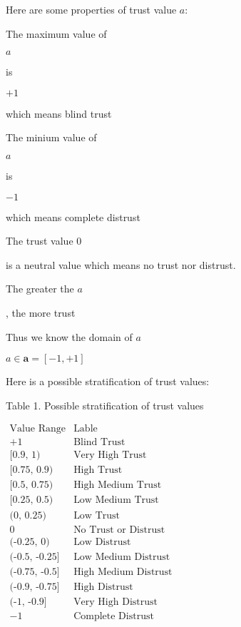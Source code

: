 \documentclass{article}
\begin{document}
Here are some properties of trust value \(a\):


\item The maximum value of 
\item \(a\)
\item  is 
\item \(+1\)
\item  which means blind trust


\item The minium value of 
\item \(a\)
\item  is 
\item \(-1\)
\item  which means complete distrust


\item The trust value \(0\)
\item  is a neutral value which means no trust nor distrust.


\item The greater the \(a\)
\item , the more trust




\item Thus we know the domain of \(a\)

\(a\in \mathbf{a}=[-1,+1]\)



Here is a possible stratification of trust values:


\caption{Table 1. Possible stratification of trust values} 


\begin{tabular}
\(\begin{array}{lc}
\hline
 \text{Value Range} & \text{Lable} \\
\hline
 +1 & \text{Blind Trust} \\
\hline
 \text{[0.9, 1)} & \text{Very High Trust} \\
 \text{[0.75, 0.9)} & \text{High Trust} \\
 \text{[0.5, 0.75)} & \text{High Medium Trust} \\
 \text{[0.25, 0.5)} & \text{Low Medium Trust} \\
 \text{(0, 0.25)} & \text{Low Trust} \\
 0 & \text{No Trust or Distrust} \\
 \text{(-0.25, 0)} & \text{Low Distrust} \\
 \text{(-0.5, -0.25]} & \text{Low Medium Distrust} \\
 \text{(-0.75, -0.5]} & \text{High Medium Distrust} \\
 \text{(-0.9, -0.75]} & \text{High Distrust} \\
 \text{(-1, -0.9]} & \text{Very High Distrust} \\
 -1 & \text{Complete Distrust} \\
\end{array}\)
\end{tabular}
\end{document}
